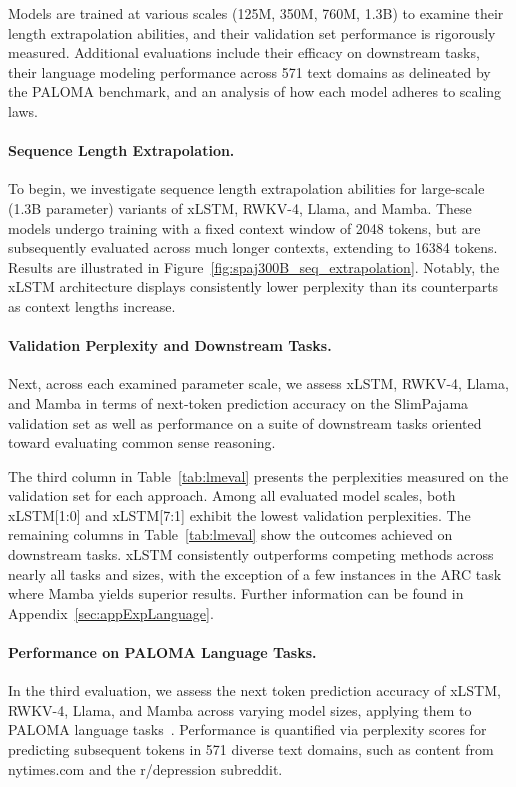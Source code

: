 Models are trained at various scales (125M, 350M, 760M, 1.3B) to examine their length extrapolation abilities, and their validation set performance is rigorously measured. Additional evaluations include their efficacy on downstream tasks, their language modeling performance across 571 text domains as delineated by the PALOMA benchmark, and an analysis of how each model adheres to scaling laws.

\paragraph{Sequence Length Extrapolation.}
\label{sec:spaj300B_ctx_extrapolation}
To begin, we investigate sequence length extrapolation abilities for large-scale (1.3B parameter) variants of xLSTM, RWKV-4, Llama, and Mamba. These models undergo training with a fixed context window of 2048 tokens, but are subsequently evaluated across much longer contexts, extending to 16384 tokens. Results are illustrated in Figure~\ref{fig:spaj300B_seq_extrapolation}. Notably, the xLSTM architecture displays consistently lower perplexity than its counterparts as context lengths increase.

\paragraph{Validation Perplexity and Downstream Tasks.}
\label{sec:spaj_downstream_eval}
Next, across each examined parameter scale, we assess xLSTM, RWKV-4, Llama, and Mamba in terms of next-token prediction accuracy on the SlimPajama validation set as well as performance on a suite of downstream tasks oriented toward evaluating common sense reasoning.

The third column in Table~\ref{tab:lmeval} presents the perplexities measured on the validation set for each approach. Among all evaluated model scales, both xLSTM[1:0] and xLSTM[7:1] exhibit the lowest validation perplexities. The remaining columns in Table~\ref{tab:lmeval} show the outcomes achieved on downstream tasks. xLSTM consistently outperforms competing methods across nearly all tasks and sizes, with the exception of a few instances in the ARC task where Mamba yields superior results. Further information can be found in Appendix~\ref{sec:appExpLanguage}.

\paragraph{Performance on PALOMA Language Tasks.} In the third evaluation, we assess the next token prediction accuracy of xLSTM, RWKV-4, Llama, and Mamba across varying model sizes, applying them to PALOMA language tasks~\citep{Magnusson:23arxivshort}. Performance is quantified via perplexity scores for predicting subsequent tokens in 571 diverse text domains, such as content from nytimes.com and the r/depression subreddit.


